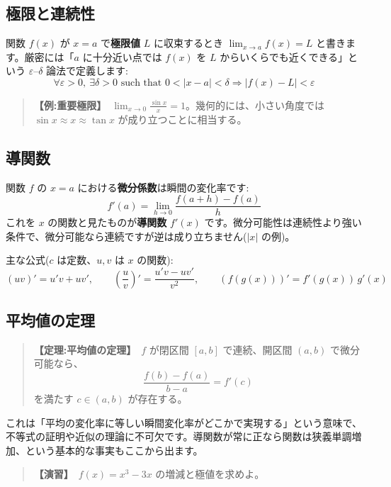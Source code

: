 \documentclass{article}
\begin{document}
\subsection{極限と連続性}

関数 \(f(x)\) が \(x = a\) で\textbf{極限値} \(L\) に収束するとき \(\lim_{x \to a} f(x) = L\) と書きます。厳密には「\(a\) に十分近い点では \(f(x)\) を \(L\) からいくらでも近くできる」という \(\varepsilon\)–\(\delta\) 論法で定義します:
\[ \forall \varepsilon > 0,\ \exists \delta > 0 \text{ such that } 0 < |x - a| < \delta \Rightarrow |f(x) - L| < \varepsilon \]

\begin{quote}
\textbf{【例:重要極限】}\ \(\displaystyle \lim_{x \to 0} \frac{\sin x}{x} = 1\)。幾何的には、小さい角度では \(\sin x \approx x \approx \tan x\) が成り立つことに相当する。
\end{quote}

\subsection{導関数}

関数 \(f\) の \(x = a\) における\textbf{微分係数}は瞬間の変化率です:
\[ f'(a) = \lim_{h \to 0} \frac{f(a+h) - f(a)}{h} \]
これを \(x\) の関数と見たものが\textbf{導関数} \(f'(x)\) です。微分可能性は連続性より強い条件で、微分可能なら連続ですが逆は成り立ちません(\(|x|\) の例)。

主な公式(\(c\) は定数、\(u, v\) は \(x\) の関数):
\[ (uv)' = u'v + uv', \qquad \left(\frac{u}{v}\right)' = \frac{u'v - uv'}{v^2}, \qquad (f(g(x)))' = f'(g(x))\, g'(x) \]

\subsection{平均値の定理}

\begin{quote}
\textbf{【定理:平均値の定理】}\ \(f\) が閉区間 \([a, b]\) で連続、開区間 \((a, b)\) で微分可能なら、
\[ \frac{f(b) - f(a)}{b - a} = f'(c) \]
を満たす \(c \in (a, b)\) が存在する。
\end{quote}

これは「平均の変化率に等しい瞬間変化率がどこかで実現する」という意味で、不等式の証明や近似の理論に不可欠です。導関数が常に正なら関数は狭義単調増加、という基本的な事実もここから出ます。

\begin{quote}
\textbf{【演習】}\ \(f(x) = x^3 - 3x\) の増減と極値を求めよ。
\end{quote}
\end{document}
